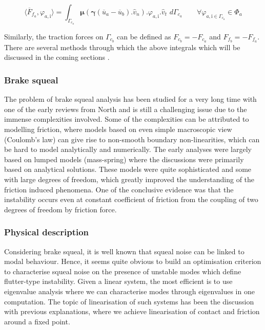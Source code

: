 \begin{equation}\label{fric_eqn}
\langle \overline{F}_{f_a},\varphi_{a,\mathrm{i}} \rangle = \int_{\Gamma_{c_a}} \boldsymbol{\mu} (\boldsymbol{\gamma} (\overline{u}_a - \overline{u}_b).\hat{v}_n). \varphi_{a,\mathrm{i}}.\hat{v}_t\,\, d\Gamma_{c_a} \qquad \forall \varphi_{a,\mathrm{i} \in \Gamma_{c_a}} \in \Phi_a
\end{equation}

Similarly, the traction forces on $\Gamma_{c_b}$ can be defined as ${F}_{c_b} = -{F}_{c_a}$ and ${F}_{f_b} = -{F}_{f_a}$. There are several methods through which the above integrals which will be discussed in the coming sections .\\
\fi








\subsubsection{Brake squeal}
The problem of brake squeal analysis has been studied for a very long time with one of the early reviews from {North} and is still a challenging issue due to the immense complexities involved. 
Some of the complexities can be attributed to modelling friction, where models based on even simple macroscopic view (Coulomb's law) can give rise to non-smooth boundary non-linearities, which can be hard to model analytically and numerically.  
The early analyses were largely based on lumped models (mass-spring) where the discussions were primarily based on analytical solutions. 
These models were quite sophisticated and some with large degrees of freedom, which greatly improved the understanding of the friction induced phenomena. 
One of the conclusive evidence was that the instability occurs even at constant coefficient of friction from the coupling of two degrees of freedom by friction force. 

\subsubsection{Physical description}\label{Phy_CEA}
Considering brake squeal, it is well known that squeal noise can be linked to modal behaviour. Hence, it seems quite obvious to build an optimisation criterion to characterise squeal noise on the presence of unstable modes which define flutter-type instability. Given a linear system, the most efficient is to use eigenvalue analysis where we can characterise modes through eigenvalues in one computation. The topic of linearisation of such systems has been the discussion with previous explanations, where we achieve linearisation of contact and friction around a fixed point.\\

